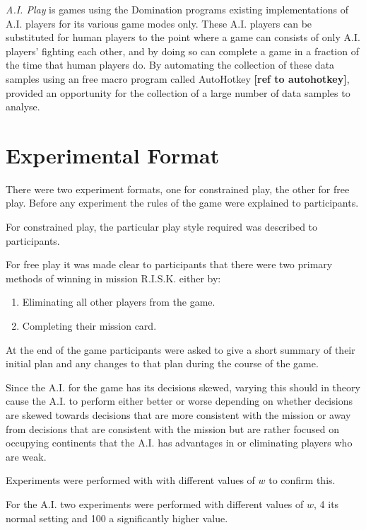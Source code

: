 \documentclass[parskip]{cs4rep}
\begin{document}
\textit{A.I. Play} is games using the Domination programs existing implementations of A.I. players for its various game modes only. These A.I. players can be substituted for human players to the point where a game can consists of only A.I. players' fighting each other, and by doing so can complete a game in a fraction of the time that human players do. By automating the collection of these data samples using an free macro program called AutoHotkey \textbf{[ref to autohotkey]}, provided an opportunity for the collection of a large number of data samples to analyse. 

\section{Experimental Format}

There were two experiment formats, one for constrained play, the other for free play. Before any experiment the rules of the game were explained to participants. 

For constrained play, the particular play style required was described to participants.

For free play it was made clear to participants that there were two primary methods of winning in mission R.I.S.K. either by:

\begin{enumerate}
\item
Eliminating all other players from the game.
\item
Completing their mission card.
\end{enumerate}

At the end of the game participants were asked to give a short summary of their initial plan and any changes to that plan during the course of the game.

Since the A.I. for the game has its decisions skewed, varying this should in theory cause the A.I. to perform either better or worse depending on whether decisions are skewed towards decisions that are more consistent with the mission or away from decisions that are consistent with the mission but are rather focused on occupying continents that the A.I. has advantages in or eliminating players who are weak.

Experiments were performed with with different values of $w$ to confirm this.

For the A.I. two experiments were performed with different values of $w$, 4 its normal setting and 100 a significantly higher value.
\end{document}
